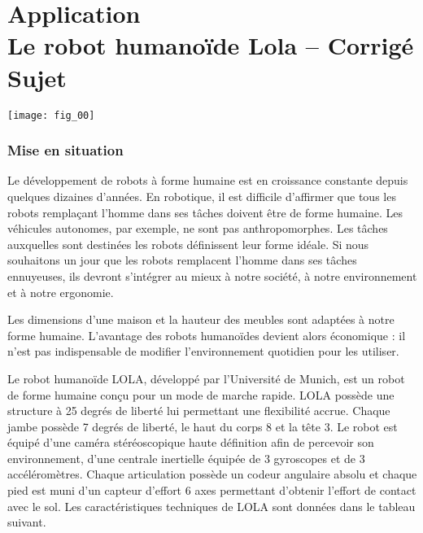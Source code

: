 \chapter*{Application  \\ 
Le robot humanoïde Lola -- \ifprof Corrigé \else Sujet \fi}

\iflivret {} \else
\ifprof  {} \else \fi
\fi

\setcounter{question}{0}
\begin{marginfigure}
\texttt{[image: fig\_00]}
\end{marginfigure}


\subsection*{Mise en situation}

\ifprof
\else
Le développement de robots à forme humaine est en
croissance constante depuis quelques dizaines
d’années. En robotique, il est difficile d’affirmer que
tous les robots remplaçant l’homme dans ses tâches
doivent être de forme humaine. Les véhicules
autonomes, par exemple, ne sont pas
anthropomorphes. Les tâches auxquelles sont
destinées les robots définissent leur forme idéale. Si
nous souhaitons un jour que les robots remplacent
l’homme dans ses tâches ennuyeuses, ils devront
s’intégrer au mieux à notre société, à notre
environnement et à notre ergonomie.

Les dimensions d’une maison et la hauteur des meubles sont adaptées à notre forme humaine. L’avantage
des robots humanoïdes devient alors économique : il n’est pas indispensable de modifier l’environnement
quotidien pour les utiliser.

Le robot humanoïde LOLA, développé par l’Université de Munich, est un robot de forme humaine
conçu pour un mode de marche rapide. LOLA possède une structure à 25 degrés de liberté lui permettant une
flexibilité accrue. Chaque jambe possède 7 degrés de liberté, le haut du corps 8 et la tête 3.
Le robot est équipé d’une caméra stéréoscopique haute définition afin de percevoir son environnement, d’une
centrale inertielle équipée de 3 gyroscopes et de 3 accéléromètres. Chaque articulation possède un codeur
angulaire absolu et chaque pied est muni d’un capteur d’effort 6 axes permettant d’obtenir l’effort de contact
avec le sol. Les caractéristiques techniques de LOLA sont données dans le tableau suivant.


